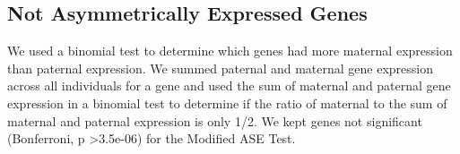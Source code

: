 \subsection{Not Asymmetrically Expressed Genes}\label{Not Asymmetrically Expressed Genes}
We used a binomial test to determine which genes had more maternal expression than paternal expression. We summed paternal and maternal gene expression across all individuals for a gene and used the sum of maternal and paternal gene expression in a binomial test to determine if the ratio of maternal to the sum of maternal and paternal expression is only 1/2. We kept genes not significant (Bonferroni, p \textgreater 3.5e-06) for the Modified ASE Test. 




